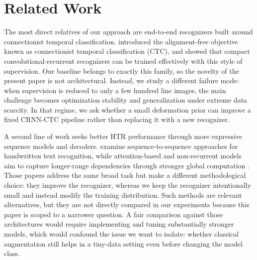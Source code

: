 \documentclass{article} %
\begin{document}
\section{Related Work}
\label{sec:related}

The most direct relatives of our approach are end-to-end recognizers built around connectionist temporal classification. \citet{graves2006ctc} introduced the alignment-free objective known as connectionist temporal classification (CTC), and \citet{shi2016crnn} showed that compact convolutional-recurrent recognizers can be trained effectively with this style of supervision. Our baseline belongs to exactly this family, so the novelty of the present paper is not architectural. Instead, we study a different failure mode: when supervision is reduced to only a few hundred line images, the main challenge becomes optimization stability and generalization under extreme data scarcity. In that regime, we ask whether a small deformation prior can improve a fixed CRNN-CTC pipeline rather than replacing it with a new recognizer.

A second line of work seeks better HTR performance through more expressive sequence models and decoders. \citet{michael2019evaluating} examine sequence-to-sequence approaches for handwritten text recognition, while attention-based and non-recurrent models aim to capture longer-range dependencies through stronger global computation \citep{vaswani2017attention,kang2022pay}. Those papers address the same broad task but make a different methodological choice: they improve the recognizer, whereas we keep the recognizer intentionally small and instead modify the training distribution. Such methods are relevant alternatives, but they are not directly compared in our experiments because this paper is scoped to a narrower question. A fair comparison against those architectures would require implementing and tuning substantially stronger models, which would confound the issue we want to isolate: whether classical augmentation still helps in a tiny-data setting even before changing the model class.
\end{document}
